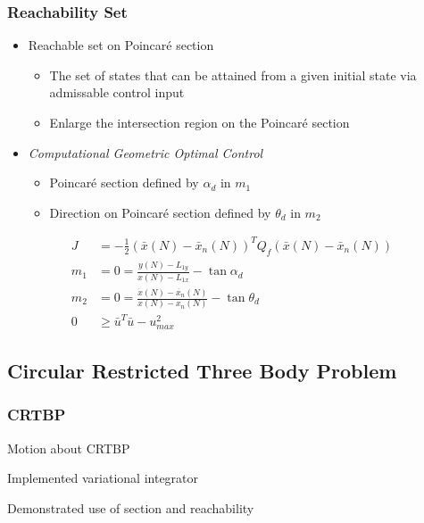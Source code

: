 \begin{frame} %
\frametitle{Reachability Set}
  \begin{itemize}
  \item Reachable set on Poincar\'e section
        \begin{itemize}
            \item The set of states that can be attained from a given initial state via admissable control input
            \item Enlarge the intersection region on the Poincar\'e section
        \end{itemize}
  \item \emph{Computational Geometric Optimal Control}
    \begin{itemize}
        \item Poincar\'e section defined by \( \alpha_d \) in \( m_1\)
        \item Direction on Poincar\'e section defined by \( \theta_d \) in \( m_2 \)
    \end{itemize}
 \end{itemize}
  \begin{align*}
    J &= -\frac{1}{2} \left( \bar{x}(N) - \bar{x}_{n}(N)\right)^T Q_f\left( \bar{x}(N) - \bar{x}_{n}(N)\right)\\
    m_1 &= 0 = \frac{y(N) - L_{1y}}{x(N) - L_{1x}} - \tan{\alpha_d} \\ 
    m_2&= 0 = \frac{\dot{x}(N) - \dot{x_n}(N) }{x(N) -x_n(N) } - \tan{\theta_d} \\
     0 &\geq\bar{u}^T \bar{u} - u_{max}^2 
    \end{align*}

\end{frame}   %


\subsection*{Circular Restricted Three Body Problem}
\begin{frame}[t]\frametitle{CRTBP}
    Motion about CRTBP

    Implemented variational integrator

    Demonstrated use of \Poincare section and reachability



\end{frame}

